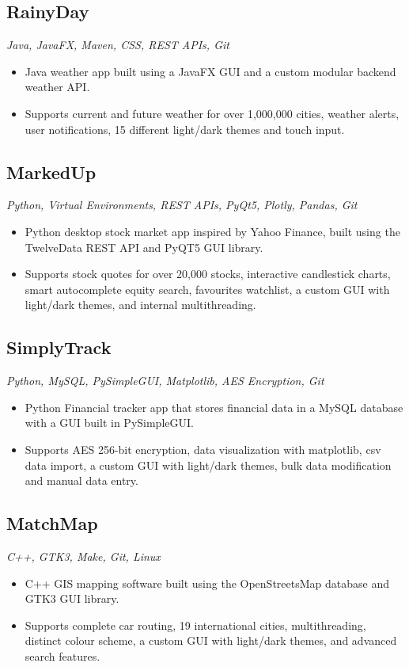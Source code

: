 \documentclass{article}
\begin{document}
\subsection*{RainyDay}
\textit{Java, JavaFX, Maven, CSS, REST APIs, Git}
\begin{itemize}
    \item Java weather app built using a JavaFX GUI and a custom modular backend weather API.
    \item Supports current and future weather for over 1,000,000 cities, weather alerts, user notifications, 15 different light/dark themes and touch input.
\end{itemize}

\subsection*{MarkedUp}
\textit{Python, Virtual Environments, REST APIs, PyQt5, Plotly, Pandas, Git}
\begin{itemize}
    \item Python desktop stock market app inspired by Yahoo Finance, built using the TwelveData REST API and PyQT5 GUI library.
    \item Supports stock quotes for over 20,000 stocks, interactive candlestick charts, smart autocomplete equity search, favourites watchlist, a custom GUI with light/dark themes, and internal multithreading.
\end{itemize}

\subsection*{SimplyTrack}
\textit{Python, MySQL, PySimpleGUI, Matplotlib, AES Encryption, Git}
\begin{itemize}
    \item Python Financial tracker app that stores financial data in a MySQL database with a GUI built in PySimpleGUI.
    \item Supports AES 256-bit encryption, data visualization with matplotlib, csv data import, a custom GUI with light/dark themes, bulk data modification and manual data entry.
\end{itemize}

\subsection*{MatchMap}
\textit{C++, GTK3, Make, Git, Linux}
\begin{itemize}
    \item C++ GIS mapping software built using the OpenStreetsMap database and GTK3 GUI library.
    \item Supports complete car routing, 19 international cities, multithreading, distinct colour scheme, a custom GUI with light/dark themes, and advanced search features.
\end{itemize}
\end{document}
